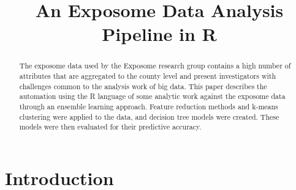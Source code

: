 \documentclass[conference,compsoc]{IEEEtran}
\begin{document}
\title{An Exposome Data Analysis Pipeline in R}

\author{
}

\maketitle

\begin{abstract}

The exposome data used by the Exposome research group contains a high number of
attributes that are aggregated to the county level and present investigators with
challenges common to the analysis work of big data. This paper describes the
automation using the R language of some analytic work against the exposome data through 
an ensemble learning approach. Feature reduction methods and k-means clustering
were applied to the data, and decision tree models were created. These models were then
evaluated for their predictive accuracy.

\end{abstract}

\section{Introduction}

% 
% 
% 
\end{document}

